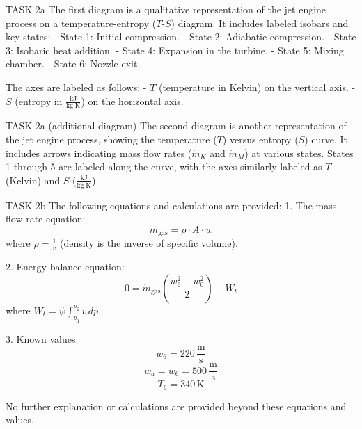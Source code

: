TASK 2a  
The first diagram is a qualitative representation of the jet engine process on a temperature-entropy (\( T \)-\( S \)) diagram. It includes labeled isobars and key states:  
- State 1: Initial compression.  
- State 2: Adiabatic compression.  
- State 3: Isobaric heat addition.  
- State 4: Expansion in the turbine.  
- State 5: Mixing chamber.  
- State 6: Nozzle exit.  

The axes are labeled as follows:  
- \( T \) (temperature in Kelvin) on the vertical axis.  
- \( S \) (entropy in \( \frac{\text{kJ}}{\text{kg·K}} \)) on the horizontal axis.  

TASK 2a (additional diagram)  
The second diagram is another representation of the jet engine process, showing the temperature (\( T \)) versus entropy (\( S \)) curve. It includes arrows indicating mass flow rates (\( \dot{m}_K \) and \( \dot{m}_M \)) at various states. States 1 through 5 are labeled along the curve, with the axes similarly labeled as \( T \) (Kelvin) and \( S \) (\( \frac{\text{kJ}}{\text{kg·K}} \)).  

TASK 2b  
The following equations and calculations are provided:  
1. The mass flow rate equation:  
\[
\dot{m}_{\text{gas}} = \rho \cdot A \cdot w
\]  
where \( \rho = \frac{1}{v} \) (density is the inverse of specific volume).  

2. Energy balance equation:  
\[
0 = \dot{m}_{\text{gas}} \left( \frac{w_6^2 - w_0^2}{2} \right) - W_t
\]  
where \( W_t = \psi \int_{p_1}^{p_2} v \, dp \).  

3. Known values:  
\[
w_6 = 220 \, \frac{\text{m}}{\text{s}}
\]  
\[
w_a = w_6 = 500 \, \frac{\text{m}}{\text{s}}
\]  
\[
T_6 = 340 \, \text{K}
\]  

No further explanation or calculations are provided beyond these equations and values.